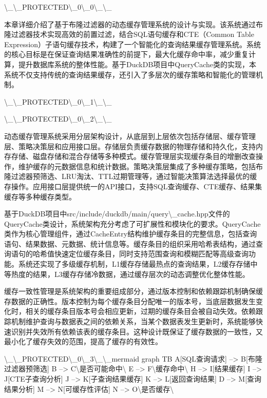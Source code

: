 \textbackslash{}_\textbackslash{}_PROTECTED\textbackslash{}_0\textbackslash{}_0\textbackslash{}_\textbackslash{}_

本章详细介绍了基于布隆过滤器的动态缓存管理系统的设计与实现。该系统通过布隆过滤器技术实现高效的前置过滤，结合SQL语句缓存和CTE（Common Table Expression）子语句缓存技术，构建了一个智能化的查询结果缓存管理系统。系统的核心目标是在保证查询结果准确性的前提下，最大化缓存命中率，减少重复计算，提升数据库系统的整体性能。基于DuckDB项目中QueryCache类的实现，本系统不仅支持传统的查询结果缓存，还引入了多层次的缓存策略和智能化的管理机制。

\textbackslash{}_\textbackslash{}_PROTECTED\textbackslash{}_0\textbackslash{}_1\textbackslash{}_\textbackslash{}_

\textbackslash{}_\textbackslash{}_PROTECTED\textbackslash{}_0\textbackslash{}_2\textbackslash{}_\textbackslash{}_

动态缓存管理系统采用分层架构设计，从底层到上层依次包括存储层、缓存管理层、策略决策层和应用接口层。存储层负责缓存数据的物理存储和持久化，支持内存存储、磁盘存储和混合存储等多种模式。缓存管理层实现缓存条目的增删改查操作，维护缓存的元数据信息和统计数据。策略决策层集成了多种缓存策略，包括布隆过滤器预筛选、LRU淘汰、TTL过期管理等，通过智能决策算法选择最优的缓存操作。应用接口层提供统一的API接口，支持SQL查询缓存、CTE缓存、结果集缓存等多种缓存类型。

基于DuckDB项目中src/include/duckdb/main/query\textbackslash{}_cache.hpp文件的QueryCache类设计，系统架构充分考虑了可扩展性和模块化的要求。QueryCache类作为核心管理组件，通过CacheEntry结构维护缓存条目的完整信息，包括查询语句、结果数据、元数据、统计信息等。缓存条目的组织采用哈希表结构，通过查询语句的哈希值快速定位缓存条目，同时支持范围查询和模糊匹配等高级查询功能。系统还实现了多级缓存机制，L1缓存存储最热点的查询结果，L2缓存存储中等热度的结果，L3缓存存储冷数据，通过缓存层次的动态调整优化整体性能。

缓存一致性管理是系统架构的重要组成部分，通过版本控制和依赖跟踪机制确保缓存数据的正确性。版本控制为每个缓存条目分配唯一的版本号，当底层数据发生变化时，相关的缓存条目版本号会相应更新，过期的缓存条目会被自动失效。依赖跟踪机制维护查询与数据表之间的依赖关系，当某个数据表发生更新时，系统能够快速识别并失效所有依赖该表的缓存条目。这种设计既保证了缓存数据的一致性，又最小化了缓存失效的范围，提高了缓存的有效性。

\textbackslash{}_\textbackslash{}_PROTECTED\textbackslash{}_0\textbackslash{}_3\textbackslash{}_\textbackslash{}_mermaid
graph TB
    A[SQL查询请求] --> B[布隆过滤器预筛选]
    B --> C\textbackslash{}{是否可能命中\textbackslash{}}
    E --> F\textbackslash{}{缓存命中\textbackslash{}}
    H --> I[结果缓存]
    I --> J[CTE子查询分析]
    J --> K[子查询结果缓存]
    K --> L[返回查询结果]
    D --> M[查询结果分析]
    M --> N[可缓存性评估]
    N --> O\textbackslash{}{是否缓存\textbackslash{}}

